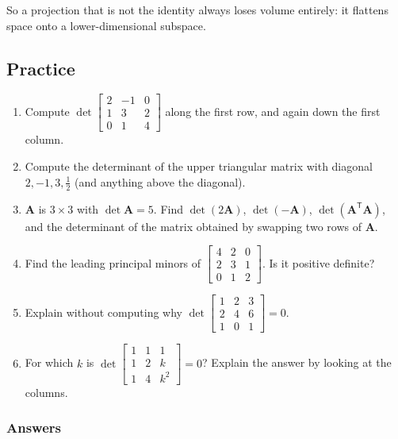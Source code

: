 \documentclass[11pt]{article}
\theoremstyle{plain}
\theoremstyle{definition}
\theoremstyle{remark}
\newcommand{\mt}[1]{\mathbf{#1}}
\newcommand{\T}{^{\mathsf{T}}}
\begin{document}
\noindent So a projection that is not the identity always loses volume
entirely: it flattens space onto a lower-dimensional subspace.

\subsection{Practice}
\begin{enumerate}[label=\textbf{P\arabic*.},leftmargin=2.6em,itemsep=5pt]
  \item Compute $\det\begin{bmatrix}2&-1&0\\1&3&2\\0&1&4\end{bmatrix}$ along the
        first row, and again down the first column.
  \item Compute the determinant of the upper triangular matrix with diagonal
        $2,-1,3,\frac12$ (and anything above the diagonal).
  \item $\mt{A}$ is $3\times3$ with $\det\mt{A}=5$. Find $\det(2\mt{A})$,
        $\det(-\mt{A})$, $\det(\mt{A}\T\mt{A})$, and the determinant of the matrix
        obtained by swapping two rows of $\mt{A}$.
  \item Find the leading principal minors of
        $\begin{bmatrix}4&2&0\\2&3&1\\0&1&2\end{bmatrix}$. Is it positive definite?
  \item Explain without computing why
        $\det\begin{bmatrix}1&2&3\\2&4&6\\1&0&1\end{bmatrix}=0$.
  \item For which $k$ is
        $\det\begin{bmatrix}1&1&1\\1&2&k\\1&4&k^{2}\end{bmatrix}=0$? Explain the
        answer by looking at the columns.
\end{enumerate}

\subsubsection*{Answers}
\end{document}
